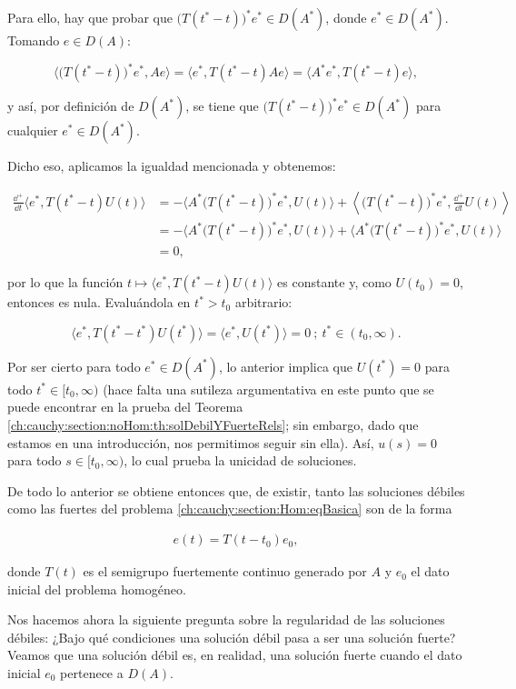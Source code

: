 Para ello, hay que probar que $\big(T(t^*-t)\big)^*e^*\in D(A^*)$, donde $e^* \in D(A^*)$. Tomando $e \in D(A)$:

\[\Big\langle \big(T(t^*-t)\big)^*e^*, Ae \Big\rangle = \langle e^*, T(t^* - t)Ae \rangle = \langle A^*e^*, T(t^*-t)e\rangle,\]

y así, por definición de $D(A^*)$, se tiene que $\big(T(t^*-t)\big)^*e^*\in D(A^*)$ para cualquier $e^* \in D(A^*)$.

Dicho eso, aplicamos la igualdad mencionada y obtenemos:

\begin{align*}
    \frac{\dd^+}{\dd t}\langle e^*, T(t^* - t)U(t) \rangle &= -\Big\langle A^*\big (T(t^* - t)\big)^*e^*, U(t) \Big\rangle + \left\langle \big (T(t^* - t)\big)^*e^*, \frac{\dd^+}{\dd t}U(t) \right\rangle\\
    &= -\Big\langle A^*\big (T(t^* - t)\big)^*e^*, U(t) \Big\rangle + \Big\langle A^*\big (T(t^* - t)\big)^*e^*, U(t) \Big\rangle\\
    &= 0,
\end{align*}

por lo que la función $t \mapsto \langle e^*, T(t^* - t)U(t) \rangle$ es constante y, como $U(t_0) = 0$, entonces es nula. Evaluándola en $t^* > t_0$ arbitrario:

\[\langle e^*, T(t^* - t^*)U(t^*)\rangle = \langle e^*, U(t^*) \rangle = 0 \ ; \ t^* \in (t_0, \infty).\]

Por ser cierto para todo $e^* \in D(A^*)$, lo anterior implica que $U(t^*) = 0$ para todo $t^* \in [t_0, \infty)$ (hace falta una sutileza argumentativa en este punto que se puede encontrar en la prueba del Teorema \eqref{ch:cauchy:section:noHom:th:solDebilYFuerteRels}; sin embargo, dado que estamos en una introducción, nos permitimos seguir sin ella). Así, $u(s) = 0$ para todo $s \in [t_0, \infty)$, lo cual prueba la unicidad de soluciones.

De todo lo anterior se obtiene entonces que, de existir, tanto las soluciones débiles como las fuertes del problema \eqref{ch:cauchy:section:Hom:eqBasica} son de la forma 

\begin{align}
    \label{Hom:FormaSoluciones}
    e(t) = T(t-t_0)e_0,
\end{align}

donde $T(t)$ es el semigrupo fuertemente continuo generado por $A$ y $e_0$ el dato inicial del problema homogéneo. 

Nos hacemos ahora la siguiente pregunta sobre la regularidad de las soluciones débiles: ¿Bajo qué condiciones una solución débil pasa a ser una solución fuerte? Veamos que una solución débil es, en realidad, una solución fuerte cuando el dato inicial $e_0$ pertenece a $D(A)$.

